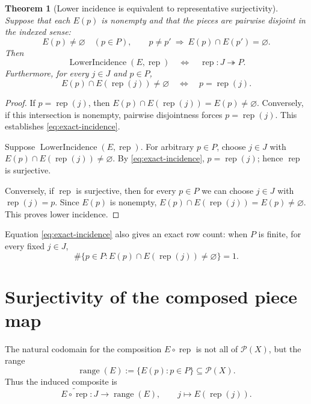 \documentclass[11pt, letterpaper]{nyjm}
\newtheorem{theorem}{Theorem}[section]
\newcommand{\range}{\operatorname{range}}
\newcommand{\rep}{\operatorname{rep}}
\newcommand{\LowerIncidence}{\operatorname{LowerIncidence}}
\begin{document}
	\begin{theorem}[Lower incidence is equivalent to representative
		surjectivity]\label{thm:lower-surjectivity}
		Suppose that each $E(p)$ is nonempty and that the pieces are pairwise
		disjoint in the indexed sense:
		\[
		E(p)\ne\varnothing\quad(p\in P),\qquad
		p\ne p'\ \Longrightarrow\ E(p)\cap E(p')=\varnothing.
		\]
		Then
		\begin{equation}\label{eq:iff-surj}
			\boxed{
				\LowerIncidence(E,\rep)
				\quad\Longleftrightarrow\quad
				\rep:J\twoheadrightarrow P.}
		\end{equation}
		Furthermore, for every $j\in J$ and $p\in P$,
		\begin{equation}\label{eq:exact-incidence}
			E(p)\cap E(\rep(j))\ne\varnothing
			\quad\Longleftrightarrow\quad p=\rep(j).
		\end{equation}
	\end{theorem}
	
	\begin{proof}
		If $p=\rep(j)$, then
		$E(p)\cap E(\rep(j))=E(p)\ne\varnothing$.
		Conversely, if this intersection is nonempty, pairwise disjointness
		forces $p=\rep(j)$. This establishes \eqref{eq:exact-incidence}.
		
		Suppose $\LowerIncidence(E,\rep)$. For arbitrary $p\in P$,
		choose $j\in J$ with
		$E(p)\cap E(\rep(j))\ne\varnothing$. By
		\eqref{eq:exact-incidence}, $p=\rep(j)$; hence $\rep$ is surjective.
		
		Conversely, if $\rep$ is surjective, then for every $p\in P$ we can
		choose $j\in J$ with $\rep(j)=p$. Since $E(p)$ is nonempty,
		$E(p)\cap E(\rep(j))=E(p)\ne\varnothing$. This proves lower incidence.
	\end{proof}
	
	\noindent
	Equation \eqref{eq:exact-incidence} also gives an exact row count:
	when $P$ is finite, for every fixed $j\in J$,
	\[
	\#\{p\in P:E(p)\cap E(\rep(j))\ne\varnothing\}=1.
	\]
	
	
	\section{Surjectivity of the composed piece map}
	
	The natural codomain for the composition $E\circ\rep$ is not all of
	$\mathcal P(X)$, but the range
	\[
	\range(E):=\{E(p):p\in P\}\subseteq\mathcal P(X).
	\]
	Thus the induced composite is
	\[
	\widetilde{E\circ\rep}:J\longrightarrow\range(E),
	\qquad j\longmapsto E(\rep(j)).
	\]
	
\end{document}

